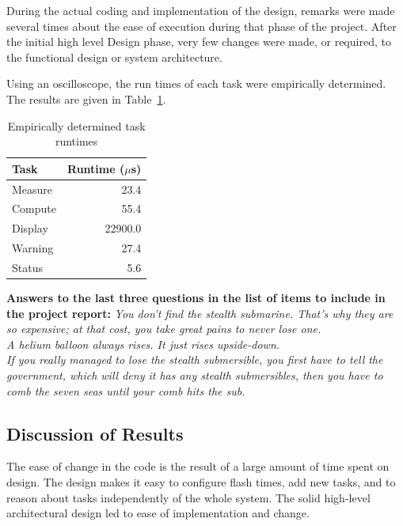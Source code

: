 \documentclass[12pt]{article} %
\begin{document}
    During the actual coding and implementation of the design, remarks were
    made several times about the ease of execution during that phase of the
    project. After the initial high level Design phase, very few changes were
    made, or required, to the functional design or system architecture.

    Using an oscilloscope, the run times of each task were empirically
    determined. The results are given in Table~\ref{tab:taskRuntimes}.

    \begin{table}[h]
      \centering
      \begin{tabular}{|l|r|} 
	\hline
	Task & Runtime ($\mu$s) \\ \hline
	Measure & 23.4 \\ \hline
	Compute & 55.4 \\ \hline
	Display & 22900.0 \\ \hline
	Warning & 27.4 \\ \hline
	Status & 5.6 \\ \hline
      \end{tabular}
      \caption{Empirically determined task runtimes}
      \label{tab:taskRuntimes}
    \end{table}

    \textbf{Answers to the last three questions in the list of items to include
    in the project report:}
    \emph{You don't find the stealth submarine. That's why they are so expensive; at that cost, you take great pains to never lose one.\\  A helium balloon always rises. It just rises upside-down. \\ If you really managed to lose the stealth submersible, you first have to tell the government, which will deny it has any stealth submersibles, then you have to comb the seven seas until your comb hits the sub.}

    \subsection{Discussion of Results}
    The ease of change in the code is the result of a large amount of time spent on
    design. The design makes it easy to configure flash times, add new tasks, and
    to reason about tasks independently of the whole system. The solid high-level
    architectural design led to ease of implementation and change.
\end{document}
